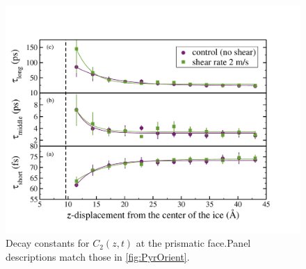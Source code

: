 \documentclass[aps,jcp,preprint,showpacs,superscriptaddress,groupedaddress]{revtex4}  %
\begin{document}
\newpage
\begin{figure}
\includegraphics[width=\linewidth]{prismatic-orient}
\caption{\label{fig:Porient} Decay constants for $C_2(z,t)$ at the prismatic face.Panel descriptions match those in \ref{fig:PyrOrient}.}
\end{figure}
\end{document}

